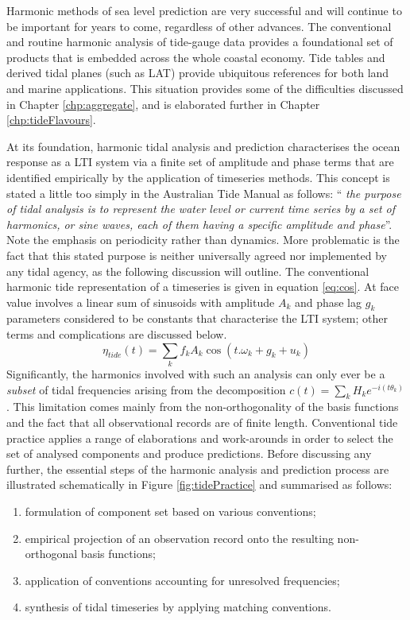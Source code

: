 Harmonic methods of sea level prediction are very successful and will continue to be important for years to come, regardless of other advances.  The conventional and routine harmonic analysis of tide-gauge data provides a foundational set of products that is embedded across the whole coastal economy. Tide tables and derived tidal planes (such as LAT) provide ubiquitous references for both land and marine applications. This situation provides some of the difficulties discussed in Chapter \ref{chp:aggregate}, and is elaborated further in  Chapter \ref{chp:tideFlavours}.


At its foundation, harmonic tidal analysis and prediction characterises the ocean response as a LTI system via a finite set of amplitude and phase terms that are identified empirically by the application of timeseries methods.   This concept is stated a little too simply in the Australian Tide Manual as follows: ``\textit{ the purpose of tidal analysis is to represent the water level or current time series by a set of harmonics, or sine waves, each of them having a specific amplitude and phase}''\citep{PCTMSL-sp9}.
Note the emphasis on periodicity rather than dynamics.  More problematic is the fact that this stated purpose is neither universally agreed nor implemented by any tidal agency, as the following discussion will outline.  
The conventional harmonic tide representation of a timeseries is given in equation \ref{eq:cos}.  At face value involves a linear sum of sinusoids with amplitude $A_k$ and phase lag $g_k$ parameters considered to be constants that characterise the LTI system; other terms and complications are discussed below.  
\begin{equation}
\eta_{tide}(t) = \sum_{k} f_k A_k \cos ( t.\omega_k + g_k + u_k)
\label{eq:cos}
\end{equation}
Significantly, the harmonics involved with such an analysis can only ever be a \emph{subset} of tidal frequencies arising from the decomposition $c(t) = \sum_{k} H_{k} e^{-i( t\theta_{k})}$.  This limitation comes mainly from the non-orthogonality of the basis functions and the fact that all observational records are of finite length.
Conventional tide practice applies a range of elaborations and work-arounds in order to select the set of analysed components and produce predictions.  
Before discussing any further, the essential steps of the harmonic analysis and prediction process are  illustrated schematically in Figure \ref{fig:tidePractice} and summarised as follows:
\begin{enumerate}
    \item formulation of component set based on various conventions;
    \item empirical projection of an observation record onto the resulting non-orthogonal basis functions;
    \item application of conventions accounting for unresolved frequencies; 
    \item synthesis of tidal timeseries by applying matching conventions.
\end{enumerate}

